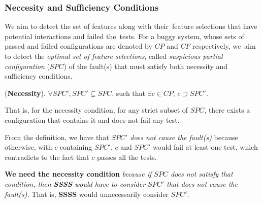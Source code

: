 \subsubsection{Neccesity and Sufficiency Conditions}

We aim to detect the set of features along with their~feature
selections that have potential interactions and failed the~tests.  For
a buggy system, whose sets of passed and failed configurations are
denoted by $CP$ and $CF$ respectively, we~aim to detect the {\em
  optimal set of feature selections}, called {\em suspicious
  partial configuration} ($SPC$) of the fault(s) that must satisfy
both necessity and sufficiency conditions.



\begin{Definition}{({\bf Necessity}).}
$\forall SPC', SPC' \subsetneq SPC$, such that $\exists c \in CP$, $c
  \supset SPC'$.
\end{Definition}

That is, for the necessity condition, for any strict subset of $SPC$,
there exists a configuration that contains it and does not fail any
test.

From the definition, we have that {\em $SPC'$ does not cause the
  fault(s)} because otherwise, with $c$ containing $SPC'$, $c$ and
$SPC'$ would fail at least one test, which contradicts to the fact
that $c$ passes all the tests.

{\bf We need the necessity condition} {\em because if $SPC$ does not
  satisfy that condition, then \textbf{SSSS} would have to consider
  $SPC'$ that does not cause the fault(s).} That is, \textbf{SSSS}
would unnecessarily consider $SPC'$.



